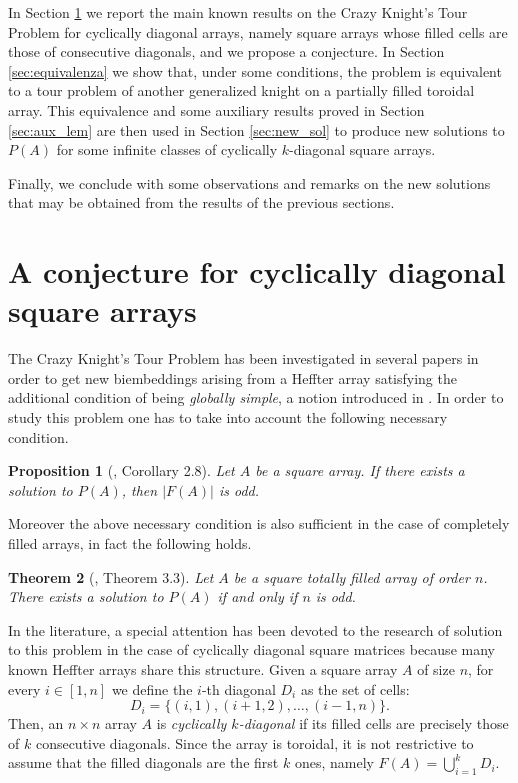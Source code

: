 \documentclass{amsart}
\newtheorem{prop}{Proposition}[section]
\newtheorem{thm}[prop]{Theorem}
\theoremstyle{definition}
\numberwithin{equation}{section}
\begin{document}
In Section \ref{sec:prima} we report 
the main known results on the Crazy Knight's Tour Problem  for  cyclically diagonal arrays, namely square arrays whose filled cells are those of consecutive diagonals, and we propose a conjecture. In Section \ref{sec:equivalenza} we show that, under some conditions, the problem is equivalent to a tour problem of another generalized knight on a partially filled toroidal array. This equivalence and some auxiliary results proved in Section \ref{sec:aux_lem} are then used in Section \ref{sec:new_sol} to produce new solutions to $P(A)$ for some infinite classes of cyclically $k$-diagonal square arrays. 

Finally, we conclude with some observations and remarks on the new solutions that may be obtained from the results of the previous sections.


\section{A conjecture for cyclically diagonal square arrays} \label{sec:prima}
The Crazy Knight's Tour Problem has been investigated in several papers \cite{CDY,CDP,CMPP, CP, CPP, DM} in order to get new biembeddings arising from a Heffter array satisfying the additional condition of being \emph{globally simple}, a notion introduced in \cite{CMPP}. In order to study this problem one has to take into account the following necessary condition.
\begin{prop}[\cite{CDP}, Corollary 2.8]\label{prop:all_odd}
Let $A$ be a square array. If there exists a solution to $P(A)$, then $|F(A)|$ is odd.
\end{prop}

Moreover the above necessary condition is also sufficient in the case of completely filled arrays, in fact the following holds.
\begin{thm}[\cite{CDP}, Theorem 3.3]
Let $A$ be a square totally filled array of order $n$. There exists a solution to $P(A)$ if and only if $n$ is odd.
\end{thm}


In the literature, a special attention has been devoted to the research of solution to this problem in the case of cyclically diagonal square matrices because many known Heffter arrays share this structure. Given a square array $A$ of size $n$, for every $i \in [1,n]$ we define the $i$-th diagonal $D_i$ as the set of cells:
\[
D_i = \{(i,1), (i+1,2), \dotsc, (i-1,n)\}.
\] 
Then, an $n\times n$ array $A$ is \textit{cyclically $k$-diagonal} if its filled cells are precisely those of $k$ consecutive diagonals. 
Since the array is toroidal, it is not restrictive to assume that the filled diagonals are the first $k$ ones, namely $F(A) = \bigcup_{i=1}^k D_i$.
\end{document}
